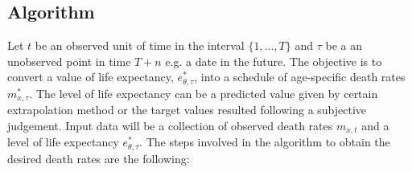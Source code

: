 \documentclass[risks,article,submit,moreauthors,pdftex]{Definitions/mdpi}
\begin{document}
\subsection{Algorithm}
Let $t$ be an observed unit of time in the interval $\lbrace 1,...,T \rbrace$ and $\tau$ be a an unobserved point in time $T+n$ e.g. a date in the future. The objective is to convert a value of life expectancy, $e_{\theta,\tau}^{*}$, into a schedule of age-specific death rates $m_{x,\tau}^{*}$. The level of life expectancy can be a predicted value given by certain extrapolation method or the target values resulted following a subjective judgement. Input data will be a collection of observed death rates $m_{x,t}$ and a level of life expectancy $e^{*}_{\theta,\tau}$. The steps involved in the algorithm to obtain the desired death rates are the following:
\end{document}
